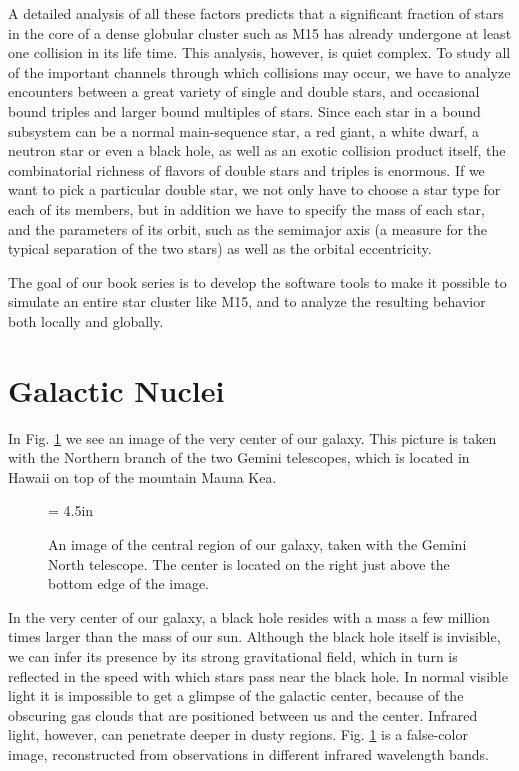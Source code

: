 A detailed analysis of all these factors predicts that a significant
fraction of stars in the core of a dense globular cluster such as M15
has already undergone at least one collision in its life time.  This
analysis, however, is quiet complex.  To study all of the important
channels through which collisions may occur, we have to analyze
encounters between a great variety of single and double stars, and
occasional bound triples and larger bound multiples of stars.  Since
each star in a bound subsystem can be a normal main-sequence star, a
red giant, a white dwarf, a neutron star or even a black hole, as well
as an exotic collision product itself, the combinatorial richness of
flavors of double stars and triples is enormous.  If we want to pick a
particular double star, we not only have to choose a star type for
each of its members, but in addition we have to specify the mass of
each star, and the parameters of its orbit, such as the semimajor axis
(a measure for the typical separation of the two stars) as well as the
orbital eccentricity.

The goal of our book series is to develop the software tools to make
it possible to simulate an entire star cluster like M15, and to
analyze the resulting behavior both locally and globally.

\clearpage  %

\section{Galactic Nuclei}

In Fig. \ref{fig:gc} we see an image of the very center of our galaxy.
This picture is taken with the Northern branch of the two Gemini
telescopes, which is located in Hawaii on top of the mountain Mauna Kea.

\begin{figure}[ht]
\begin{center}
\epsfxsize = 4.5in
\caption[An image of the central region of our galaxy]
{An image of the central region of our galaxy, taken with the Gemini
North telescope.  The center is located on the right just above the
bottom edge of the image.}
\label{fig:gc}
\end{center}
\end{figure}

In the very center of our galaxy, a black hole resides with a mass
a few million times larger than the mass of our sun.  Although the
black hole itself is invisible, we can infer its presence by its
strong gravitational field, which in turn is reflected in the speed
with which stars pass near the black hole.  In normal visible light it
is impossible to get a glimpse of the galactic center, because of the
obscuring gas clouds that are positioned between us and the center.
Infrared light, however, can penetrate deeper in dusty regions.
Fig. \ref{fig:gc} is a false-color image, reconstructed from
observations in different infrared wavelength bands.

